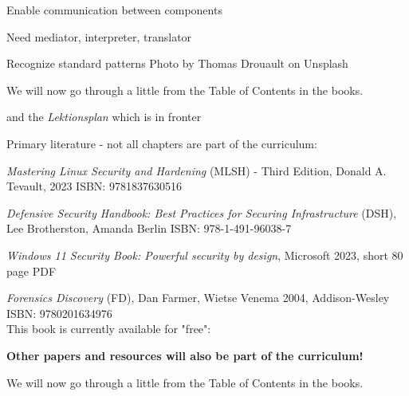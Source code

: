 \documentclass[Screen16to9,17pt]{foils}
\begin{document}



\begin{list2}
\item Enable communication between components
\item Need mediator, interpreter, translator
\item Recognize standard patterns \hfill Photo by Thomas Drouault on Unsplash
\end{list2}



We will now go through a little from the Table of Contents in the books.

and the \emph{Lektionsplan} which is in fronter


Primary literature - not all chapters are part of the curriculum:
\begin{list2}
\item
\emph{Mastering Linux Security and Hardening} (MLSH) - Third Edition, Donald A. Tevault, 2023 ISBN: 9781837630516
\item \emph{Defensive Security Handbook: Best Practices for Securing Infrastructure} (DSH), Lee Brotherston, Amanda Berlin ISBN: 978-1-491-96038-7
\item \emph{Windows 11 Security Book: Powerful security by design}, Microsoft 2023, short 80 page PDF\\ {\scriptsize{}}
\item \emph{Forensics Discovery} (FD), Dan Farmer, Wietse Venema 2004, Addison-Wesley\\
ISBN: 9780201634976\\
This book is currently available for "free":\\

\end{list2}

{\bf Other papers and resources will also be part of the curriculum!}



We will now go through a little from the Table of Contents in the books.
\end{document}
